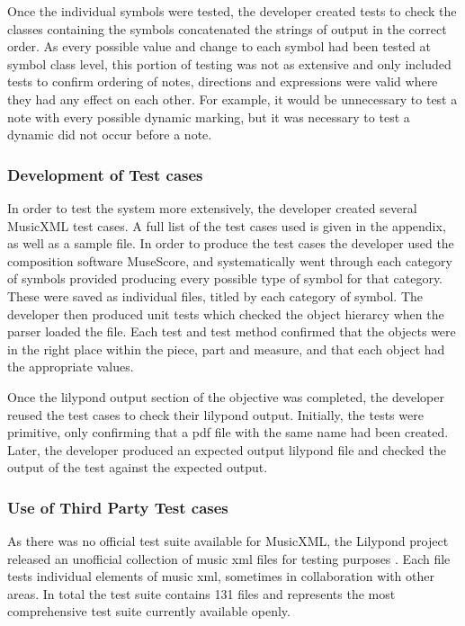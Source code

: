 Once the individual symbols were tested, the developer created tests to check the classes containing the symbols concatenated the strings of output in the correct order. As every possible value and change to each symbol had been tested at symbol class level, this portion of testing was not as extensive and only included tests to confirm ordering of notes, directions and expressions were valid where they had any effect on each other. For example, it would be unnecessary to test a note with every possible dynamic marking, but it was necessary to test a dynamic did not occur before a note.


\subsubsection{Development of Test cases}
In order to test the system more extensively, the developer created several MusicXML test cases. A full list of the test cases used is given in the appendix, as well as a sample file. In order to produce the test cases the developer used the composition software MuseScore, and systematically went through each category of symbols provided producing every possible type of symbol for that category. These were saved as individual files, titled by each category of symbol.
The developer then produced unit tests which checked the object hierarcy when the parser loaded the file. Each test and test method confirmed that the objects were in the right place within the piece, part and measure, and that each object had the appropriate values.

Once the lilypond output section of the objective was completed, the developer reused the test cases to check their lilypond output. Initially, the tests were primitive, only confirming that a pdf file with the same name had been created. Later, the developer produced an expected output lilypond file and checked the output of the test against the expected output.

\subsubsection{Use of Third Party Test cases}
As there was no official test suite available for MusicXML, the Lilypond project released an unofficial collection of music xml files for testing purposes \parencite{LilypondTestcase}. Each file tests individual elements of music xml, sometimes in collaboration with other areas. In total the test suite contains 131 files and represents the most comprehensive test suite currently available openly.

